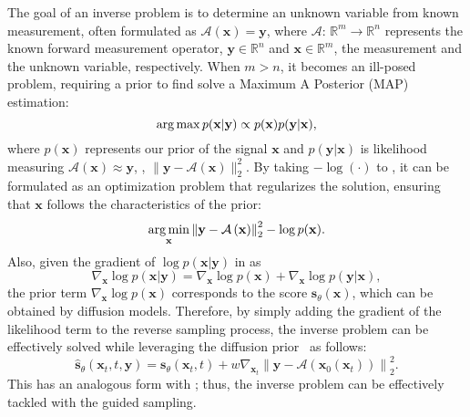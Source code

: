 The goal of an inverse problem is to determine an unknown variable from known measurement, often formulated as $\mathcal{A}(\mathbf{x})=\mathbf{y}$,
where $\mathcal{A}{:}\, \mathbb{R}^m {\rightarrow}  \mathbb{R}^n$ represents the known forward measurement operator, $\mathbf{y}\in \mathbb{R}^n$ and $\mathbf{x}\in \mathbb{R}^m$,
the measurement and the unknown variable, respectively.
When 
$m>n$, it becomes an ill-posed problem, requiring a prior to find 
solve a
Maximum A Posterior (MAP) estimation:
\begin{equation}
\label{eq:map}
    \argmax p(\mathbf{x}|\mathbf{y})\propto p(\mathbf{x}) p(\mathbf{y} | \mathbf{x}),
\end{equation}
where $p(\mathbf{x})$ represents our prior of the signal $\mathbf{x}$ and $p(\mathbf{y} | \mathbf{x})$ is likelihood measuring 
$\mathcal{A}(\mathbf{x})\approx\mathbf{y}$, \eg, $\|\mathbf{y} {-} \mathcal{A}(\mathbf{x})\|_2^2$.
By taking $-\log(\cdot)$ to , it can be  
formulated as an optimization problem
that regularizes the solution, ensuring that $\mathbf{x}$ follows the characteristics of the prior:
\begin{equation}
    \label{eq:inv_opt}
    \argmin_{\mathbf{x}} \left\|\mathbf{y} - \mathcal{A}\left(\mathbf{x}\right) \right\|_2^2 - \log p(\mathbf{x}).
\end{equation}
Also, given the gradient of $\log p(\mathbf{x}|\mathbf{y})$ in  as
\begin{equation}
    \nabla_{\mathbf{x}}\log p(\mathbf{x}|\mathbf{y}) =  \nabla_{\mathbf{x}}\log p(\mathbf{x}) + \nabla_{\mathbf{x}}\log p(\mathbf{y} | \mathbf{x}),
\end{equation}
the prior term $\nabla_{\mathbf{x}}\log p(\mathbf{x})$ corresponds to the score $\mathbf{s}_{\theta}(\mathbf{x})$, which can be obtained by diffusion models.
Therefore, by simply adding the gradient of the likelihood term to the reverse sampling process, the inverse problem can be effectively solved while leveraging the diffusion prior~\cite{chung2023dps}
as follows:
\begin{equation}
    \label{eq:inv_sampling}
    \hat{\mathbf{s}}_{\theta}(\mathbf{x}_t, t, \mathbf{y}) = \mathbf{s}_{\theta}(\mathbf{x}_t, t) + w \nabla_{\mathbf{x}_t}\left\| \mathbf{y} - \mathcal{A}\left(\mathbf{x}_0\left(\mathbf{x}_t\right)\right) \right\|_2^2.
\end{equation}
This has an analogous form with ; thus, the inverse problem can be effectively tackled with the guided sampling.


